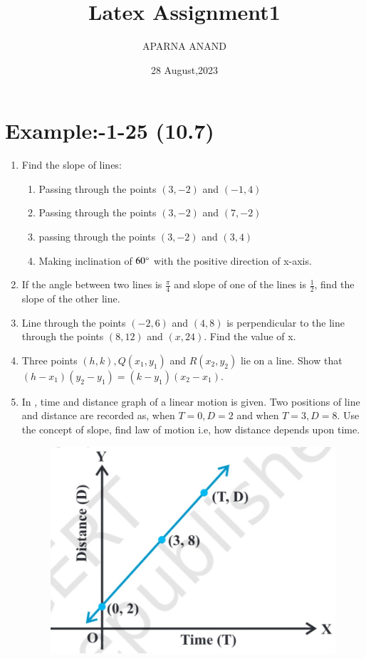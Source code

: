 \documentclass{article}
\theoremstyle{remark}
\begin{document}
\title{Latex Assignment1}
\author{APARNA ANAND}
\date{28 August,2023}
\maketitle
\section*{Example:-1-25 (10.7)}
\begin{enumerate}
\item Find the slope of lines:
\begin{enumerate}
\item  Passing through the points $(3,-2)$ and $(-1,4)$
\item  Passing through the points $(3,-2)$ and $(7,-2)$
\item  passing through the points $(3,-2)$ and $(3,4)$	
\item  Making inclination of $60\degree$ with the positive direction of x-axis.
\end{enumerate}
\item If the angle between two lines is $\frac{\pi}{4}$ and slope of one of the lines is $\frac{1}{2}$, find the slope of the other line.
\item Line through the points $(-2,6)$ and $(4,8)$ is perpendicular to the line through the points $(8,12)$ and $(x,24)$. Find the value of x.
\item Three points $(h,k), Q(x_1,y_1)$ and $R(x_2,y_2)$ lie on a line. Show that $(h-x_1)(y_2-y_1)=(k-y_1)(x_2-x_1)$.
\item In , time and distance graph of a linear motion is given. Two positions of line and distance are recorded as, when $T=0,D=2$ and when $T=3,D=8$. Use the concept of slope, find law of motion i.e, how distance depends upon time.
\begin{figure}[h]
\centering
\includegraphics[width=\columnwidth]{figs/10.9.png}

\end{figure}
\end{enumerate}
\end{document}
